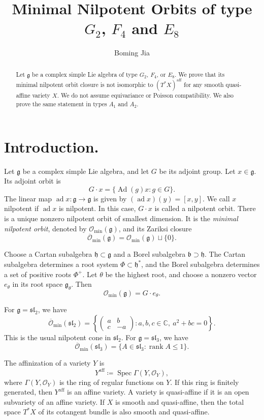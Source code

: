 \documentclass[12pt]{article}
\title{Minimal Nilpotent Orbits of type $G_2$, $F_4$ and $E_8$}
\author{Boming Jia}
\date{}
\theoremstyle{definition}
\DeclareMathOperator{\Spec}{Spec}
\DeclareMathOperator{\Ad}{Ad}
\DeclareMathOperator{\ad}{ad}
\DeclareMathOperator{\rk}{rank}
\newcommand{\C}{\mathbb C}
\newcommand{\Lieg}{\mathfrak{g}}
\newcommand{\h}{\mathfrak h}
\newcommand{\OO}{\mathcal O}
\newcommand{\Omin}{\mathcal O_{\min}}
\newcommand{\Ominbar}{\overline{\mathcal O}_{\min}}
\newcommand{\aff}{\mathrm{aff}}
\begin{document}
\setlength{\droptitle}{-6em}
\maketitle
\vspace{-4em}

\begin{abstract}
Let $\Lieg$ be a complex simple Lie algebra of type $G_2$, $F_4$, or $E_8$. We prove that its minimal nilpotent orbit closure is not isomorphic to $(T^*X)^\aff$ for any smooth quasi-affine variety $X$. We do not assume equivariance or Poisson compatibility. We also prove the same statement in types $A_1$ and $A_2$.
\end{abstract}

\section{Introduction.}

Let $\Lieg$ be a complex simple Lie algebra, and let $G$ be its adjoint group. Let $x\in\Lieg$. Its adjoint orbit is
\[
    G\cdot x=\{\Ad(g)x:g\in G\}.
\]
The linear map $\ad x:\Lieg\to\Lieg$ is given by $(\ad x)(y)=[x,y]$. We call $x$ {nilpotent} if $\ad x$ is nilpotent. In this case, $G\cdot x$ is called a {nilpotent orbit}. There is a unique nonzero nilpotent orbit of smallest dimension. It is the \emph{minimal nilpotent orbit}, denoted by $\Omin(\Lieg)$, and its Zariksi closure
    $$\Ominbar(\Lieg)=\Omin(\Lieg)\sqcup\{0\}.$$

Choose a Cartan subalgebra $\h\subset\Lieg$ and a Borel subalgebra $\mathfrak b\supset\h$. The Cartan subalgebra determines a root system $\Phi\subset\h^*$, and the Borel subalgebra determines a set of positive roots $\Phi^+$. Let $\theta$ be the highest root, and choose a nonzero vector $e_\theta$ in its root space $\Lieg_\theta$. Then
\[
    \Omin(\Lieg)=G\cdot e_\theta.
\]

For $\Lieg=\mathfrak{sl}_2$, we have
\[
    \Ominbar(\mathfrak{sl}_2)
    =\left\{
      \begin{pmatrix}a&b\\ c&-a\end{pmatrix}:a,b,c\in\C,\ a^2+bc=0
     \right\}.
\]
This is the usual nilpotent cone in $\mathfrak{sl}_2$. For $\Lieg=\mathfrak{sl}_3$, we have
\[
    \Ominbar(\mathfrak{sl}_3)
    =\{A\in\mathfrak{sl}_3:\rk A\le1\}.
\]

The {affinization} of a variety $Y$ is
\[
    Y^\aff\coloneqq\Spec\Gamma(Y,\OO_Y),
\]
where $\Gamma(Y,\OO_Y)$ is the ring of regular functions on $Y$. If this ring is finitely generated, then $Y^\aff$ is an affine variety.
A variety is {quasi-affine} if it is an open subvariety of an affine variety. If $X$ is smooth and quasi-affine, then the total space $T^*X$ of its cotangent bundle is also smooth and quasi-affine.
\end{document}
